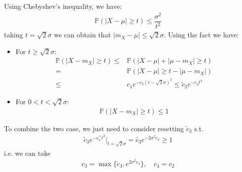 \documentclass[11pt,a4paper]{ctexart}
\numberwithin{equation}{section}%
\begin{document}
Using Chebyshev's inequality, we have:
\begin{align*}
    \mathbb{P}\left( \left\vert X- \mu  \right\vert \geq t  \right)   \leq \dfrac{ \sigma ^2 }{ t^2 }
\end{align*}
taking $ t=\sqrt{2}\sigma  $ we can obtain that $ \left\vert m_X-\mu  \right\vert \leq \sqrt{2 }\sigma  $. Using the fact we have:
\begin{itemize}[topsep=2pt,itemsep=0pt]
    \item For $ t \geq \sqrt{2}\sigma  $:
    \begin{align*}
        \mathbb{P}\left( \left\vert X-m_X \right\vert  \geq t \right) \leq & \mathbb{P}\left( \left\vert X-\mu  \right\vert + \left\vert \mu -m_X \right\vert \geq t \right)\\
        =& \mathbb{P}\left( \left\vert X-\mu  \right\vert \geq t-\left\vert \mu -m_X \right\vert  \right)\\
        \leq &c_1e^{-c_2(t-\sqrt{2}\sigma )^2} \leq \tilde{c}_3e^{-c_4t^2}
    \end{align*}
    \item For $ 0 < t < \sqrt{2}\sigma  $: 
    \begin{align*}
        \mathbb{P}\left( \left\vert X-m_X \right\vert  \geq t \right)  \leq 1
    \end{align*}
\end{itemize}
To combine the two case, we just need to consider resetting $ \tilde{c}_3 $ s.t.
\begin{align*}
    \tilde{c}_3e^{-c_4^{>}t^2}\Big|_{t=\sqrt{2}\sigma } = \tilde{c_3}e^{-2\sigma ^2c_4} \geq 1
\end{align*}
i.e. we can take
\begin{align*}
    c_3 = \max \{ \tilde{c}_3, e^{2\sigma ^2c_4} \} ,\quad c_4 = c_2
\end{align*}
\end{document}
